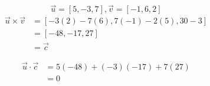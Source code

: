 \documentclass[10pt, leqno21]{article}
\theoremstyle{plain}
\theoremstyle{definition}
\theoremstyle{remark}
\theoremstyle{definition}
\begin{document}
\[
  \vec{u} = \left[5, -3, 7\right], \vec{v} = \left[-1, 6, 2\right]
\]
\begin{align*}
  \vec{u} \times \vec{v} &= \left[-3(2) - 7(6), 7(-1) - 2(5), 30 - 3\right] \\
  &= \left[-48, -17, 27\right] \\
  &= \vec{c}
\end{align*}

\begin{align*}
  \vec{u} \cdot \vec{c} &= 5(-48) + (-3)(-17) + 7(27) \\
  &= 0
\end{align*}
\end{document}
